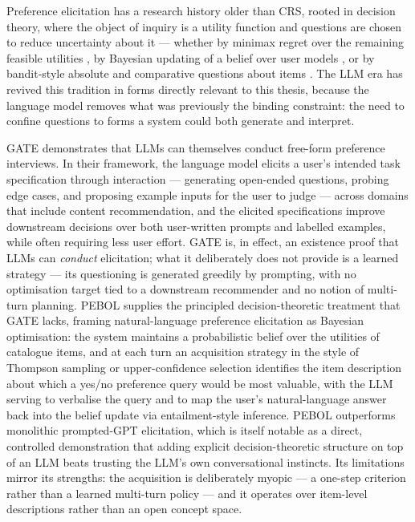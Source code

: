 Preference elicitation has a research history older than CRS, rooted in decision theory, where the object of inquiry is a utility function and questions are chosen to reduce uncertainty about it — whether by minimax regret over the remaining feasible utilities \citep{viappiani2009regret}, by Bayesian updating of a belief over user models \citep{mangili2020bayesian}, or by bandit-style absolute and comparative questions about items \citep{christakopoulou2016towards}. The LLM era has revived this tradition in forms directly relevant to this thesis, because the language model removes what was previously the binding constraint: the need to confine questions to forms a system could both generate and interpret.

GATE \citep{li2023eliciting} demonstrates that LLMs can themselves conduct free-form preference interviews. In their framework, the language model elicits a user's intended task specification through interaction — generating open-ended questions, probing edge cases, and proposing example inputs for the user to judge — across domains that include content recommendation, and the elicited specifications improve downstream decisions over both user-written prompts and labelled examples, while often requiring less user effort. GATE is, in effect, an existence proof that LLMs can \textit{conduct} elicitation; what it deliberately does not provide is a learned strategy — its questioning is generated greedily by prompting, with no optimisation target tied to a downstream recommender and no notion of multi-turn planning. PEBOL \citep{austin2024bayesian} supplies the principled decision-theoretic treatment that GATE lacks, framing natural-language preference elicitation as Bayesian optimisation: the system maintains a probabilistic belief over the utilities of catalogue items, and at each turn an acquisition strategy in the style of Thompson sampling or upper-confidence selection identifies the item description about which a yes/no preference query would be most valuable, with the LLM serving to verbalise the query and to map the user's natural-language answer back into the belief update via entailment-style inference. PEBOL outperforms monolithic prompted-GPT elicitation, which is itself notable as a direct, controlled demonstration that adding explicit decision-theoretic structure on top of an LLM beats trusting the LLM's own conversational instincts. Its limitations mirror its strengths: the acquisition is deliberately myopic — a one-step criterion rather than a learned multi-turn policy — and it operates over item-level descriptions rather than an open concept space.

